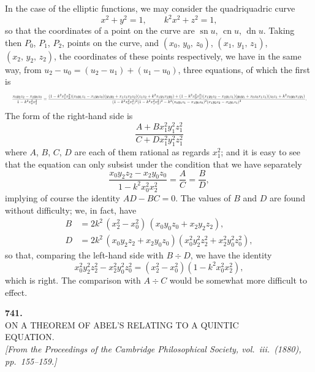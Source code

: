 \documentclass[11pt]{article}
\begin{document}
In the case of the elliptic functions, we may consider the quadriquadric curve
\[
   x^2 + y^2 = 1,\qquad k^2 x^2 + z^2 = 1,
\]
so that the coordinates of a point on the curve are $\operatorname{sn} u$, $\operatorname{cn} u$, $\operatorname{dn} u$. Taking then
$P_0$, $P_1$, $P_2$, points on the curve, and $(x_0,\, y_0,\, z_0)$, $(x_1,\, y_1,\, z_1)$, $(x_2,\, y_2,\, z_2)$, the coordinates of
these points respectively, we have in the same way, from $u_2 - u_0 = (u_2 - u_1) + (u_1 - u_0)$,
three equations, of which the first is
\[
   \resizebox{\textwidth}{!}{$\displaystyle
   \frac{x_0 y_2 z_2 - x_2 y_0 z_0}{1 - k^2 x_0^2 x_2^2}
   = \frac{(1 - k^2 x_1^2 x_2^2)(x_0 y_1 z_1 - x_1 y_0 z_0)(y_1 y_2 + x_1 z_1 x_2 z_2)(z_1 z_2 + k^2 x_1 y_1 x_2 y_2)
         + (1 - k^2 x_0^2 x_1^2)(x_1 y_2 z_2 - x_2 y_1 z_1)(y_0 y_1 + x_0 z_0 x_1 z_1)(z_0 z_1 + k^2 x_0 y_0 x_1 y_1)}
         {(1 - k^2 x_0^2 x_1^2)^2 (1 - k^2 x_1^2 x_2^2)^2 - k^2 (x_0 y_1 z_1 - x_1 y_0 z_0)^2 (x_1 y_2 z_2 - x_2 y_1 z_1)^2}.$}
\]
The form of the right-hand side is
\[
   \frac{A + B x_1^2 y_1^2 z_1^2}{C + D x_1^2 y_1^2 z_1^2}
\]
where $A$, $B$, $C$, $D$ are each of them rational as regards $x_1^2$; and it is easy to see
that the equation can only subsist under the condition that we have separately
\[
   \frac{x_0 y_2 z_2 - x_2 y_0 z_0}{1 - k^2 x_0^2 x_2^2} = \frac{A}{C} = \frac{B}{D},
\]
implying of course the identity $AD - BC = 0$. The values of $B$ and $D$ are found
without difficulty; we, in fact, have
\begin{align*}
   B &= 2k^2\,(x_2^2 - x_0^2)\,(x_0 y_0 z_0 + x_2 y_2 z_2),\\
   D &= 2k^2\,(x_0 y_2 z_2 + x_2 y_0 z_0)(x_0^2 y_2^2 z_2^2 + x_2^2 y_0^2 z_0^2),
\end{align*}
so that, comparing the left-hand side with $B \div D$, we have the identity
\[
   x_0^2 y_2^2 z_2^2 - x_2^2 y_0^2 z_0^2 = (x_2^2 - x_0^2)(1 - k^2 x_0^2 x_2^2),
\]
which is right. The comparison with $A \div C$ would be somewhat more difficult to effect.

\bigskip

\begin{center}
\textbf{741.}\\[6pt]
\textsc{ON A THEOREM OF ABEL'S RELATING TO A QUINTIC\\
EQUATION.}\\[6pt]
\textit{[From the Proceedings of the Cambridge Philosophical Society, vol.\ iii.\ (1880),\\
pp.\ 155--159.]}
\end{center}
\end{document}

